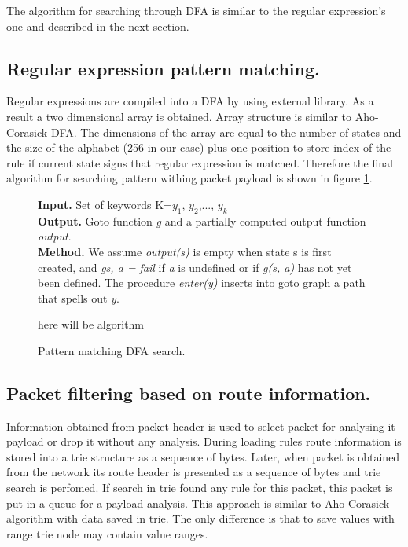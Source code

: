 \documentclass[thesis=M,english]{FITthesis}[2011/07/15]
\begin{document}
The algorithm for searching through DFA is similar to the regular expression's one and described in the next section.

\subsection*{Regular expression pattern matching.}
Regular expressions are compiled into a DFA by using external library. As a result a two dimensional array is obtained. Array structure is similar to Aho-Corasick DFA. The dimensions of the array are equal to the number of states and the size of the alphabet (256 in our case) plus one position to store index of the rule if current state signs that regular expression is matched. Therefore the final algorithm for searching pattern withing packet payload is shown in figure \ref{fig:dfa_search}.

\begin{figure}[h]
\textbf{Input.} Set of keywords K={$y_1$, $y_2$,..., $y_k$} \\
\textbf{Output.} Goto function \emph{g} and a partially computed output function \emph{output}.\\
\textbf{Method.} We assume \emph{output(s)} is empty when state s is first created, and \emph{g{s, a} = fail} if \emph{a} is undefined or if \emph{g(s, a)} has not yet been defined. The procedure \emph{enter(y)} inserts into goto graph a path that spells out \emph{y}.
\begin{algorithmic}
\PRINT here will be algorithm
\end{algorithmic}
\caption{Pattern matching DFA search.}
\label{fig:dfa_search}
\end{figure}

\subsection*{Packet filtering based on route information.}
Information obtained from packet header is used to select packet for analysing it payload or drop it without any analysis. During loading rules route information is stored into a trie structure as a sequence of bytes. Later, when packet is obtained from the network its route header is presented as a sequence of bytes and trie search is perfomed. If search in trie found any rule for this packet, this packet is put in a queue for a payload analysis. This approach is similar to Aho-Corasick algorithm with data saved in trie. The only difference is that to save values with range trie node may contain value ranges.
\end{document}
